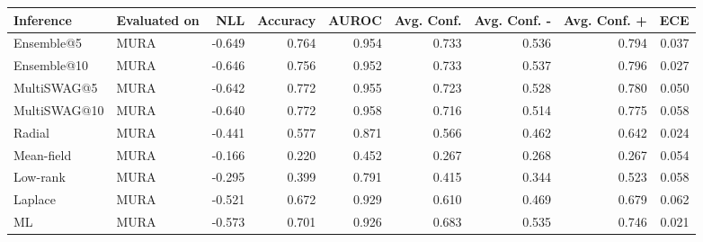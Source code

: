 \begin{tabular}{llrrrrrrr}
\toprule
Inference & Evaluated on & NLL & Accuracy & AUROC & Avg. Conf. & Avg. Conf. - & Avg. Conf. + & ECE \\
\midrule
Ensemble@5 & MURA & -0.649 & 0.764 & 0.954 & 0.733 & 0.536 & 0.794 & 0.037 \\
Ensemble@10 & MURA & -0.646 & 0.756 & 0.952 & 0.733 & 0.537 & 0.796 & 0.027 \\
MultiSWAG@5 & MURA & -0.642 & 0.772 & 0.955 & 0.723 & 0.528 & 0.780 & 0.050 \\
MultiSWAG@10 & MURA & -0.640 & 0.772 & 0.958 & 0.716 & 0.514 & 0.775 & 0.058 \\
Radial & MURA & -0.441 & 0.577 & 0.871 & 0.566 & 0.462 & 0.642 & 0.024 \\
Mean-field & MURA & -0.166 & 0.220 & 0.452 & 0.267 & 0.268 & 0.267 & 0.054 \\
Low-rank & MURA & -0.295 & 0.399 & 0.791 & 0.415 & 0.344 & 0.523 & 0.058 \\
Laplace & MURA & -0.521 & 0.672 & 0.929 & 0.610 & 0.469 & 0.679 & 0.062 \\
ML & MURA & -0.573 & 0.701 & 0.926 & 0.683 & 0.535 & 0.746 & 0.021 \\
\bottomrule
\end{tabular}


